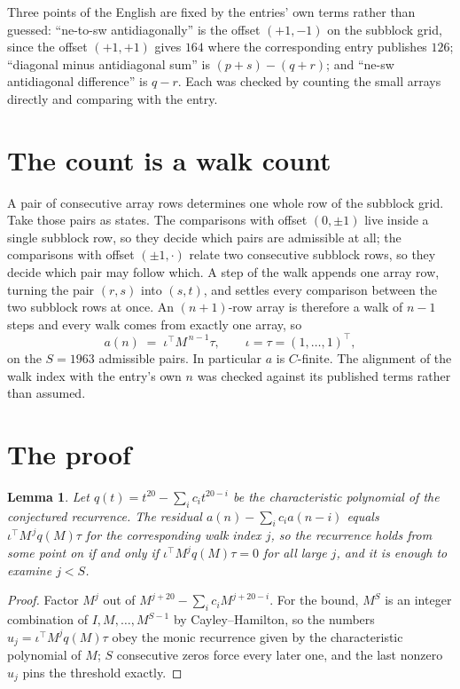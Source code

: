 \documentclass[11pt,a4paper]{article}
\theoremstyle{plain}
\newtheorem{lemma}[theorem]{Lemma}
\theoremstyle{definition}
\begin{document}
Three points of the English are fixed by the entries' own terms rather than guessed:
``ne-to-sw antidiagonally'' is the offset $(+1,-1)$ on the subblock grid, since the offset
$(+1,+1)$ gives $164$ where the corresponding entry publishes $126$; ``diagonal minus
antidiagonal sum'' is $(p+s)-(q+r)$; and ``ne-sw antidiagonal difference'' is $q-r$. Each was
checked by counting the small arrays directly and comparing with the entry.

\section{The count is a walk count}

A pair of consecutive array rows determines one whole row of the subblock grid. Take those
pairs as states. The comparisons with offset $(0,\pm1)$ live inside a single subblock row, so
they decide which pairs are admissible at all; the comparisons with offset $(\pm1,\cdot)$
relate two consecutive subblock rows, so they decide which pair may follow which. A step of the
walk appends one array row, turning the pair $(r,s)$ into $(s,t)$, and settles every comparison
between the two subblock rows at once. An $(n+1)$-row array is therefore a walk of $n-1$ steps
and every walk comes from exactly one array, so
\[
a(n)\;=\;\iota^{\!\top}M^{\,n-1}\tau,\qquad \iota=\tau=(1,\dots,1)^{\!\top},
\]
on the $S=1963$ admissible pairs. In particular $a$ is $C$-finite. The alignment of the walk
index with the entry's own $n$ was checked against its published terms rather than assumed.

\section{The proof}

\begin{lemma}\label{lem:crit}
Let $q(t)=t^{20}-\sum_i c_it^{20-i}$ be the characteristic polynomial of the
conjectured recurrence. The residual $a(n)-\sum_ic_ia(n-i)$ equals
$\iota^{\!\top}M^{\,j}q(M)\tau$ for the corresponding walk index $j$, so the recurrence
holds from some point on if and only if $\iota^{\!\top}M^{j}q(M)\tau=0$ for all large $j$,
and it is enough to examine $j<S$.
\end{lemma}

\begin{proof}
Factor $M^{j}$ out of $M^{j+20}-\sum_ic_iM^{j+20-i}$. For the bound, $M^{S}$
is an integer combination of $I,M,\dots,M^{S-1}$ by Cayley--Hamilton, so the numbers
$u_j=\iota^{\!\top}M^{j}q(M)\tau$ obey the monic recurrence given by the characteristic
polynomial of $M$; $S$ consecutive zeros force every later one, and the last nonzero $u_j$
pins the threshold exactly.
\end{proof}
\end{document}
